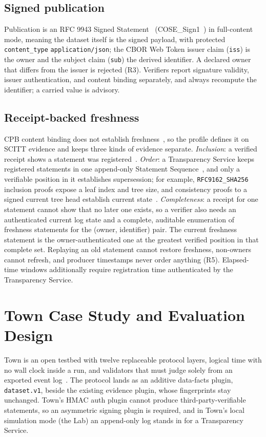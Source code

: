 \documentclass[conference]{IEEEtran}
\begin{document}
\subsection{Signed publication}
Publication is an RFC 9943 Signed Statement~\cite{rfc9943} (COSE\_Sign1~\cite{rfc9052}) in full-content mode, meaning the dataset itself is the signed payload, with protected \texttt{content\_type} \texttt{application/json}; the CBOR Web Token issuer claim (\texttt{iss}) is the owner and the subject claim (\texttt{sub}) the derived identifier. A declared owner that differs from the issuer is rejected (R3). Verifiers report signature validity, issuer authentication, and content binding separately, and always recompute the identifier; a carried value is advisory.

\subsection{Receipt-backed freshness}
CPB content binding does not establish freshness~\cite{cpb03}, so the profile defines it on SCITT evidence and keeps three kinds of evidence separate. \emph{Inclusion}: a verified receipt shows a statement was registered~\cite{rfc9942}. \emph{Order}: a Transparency Service keeps registered statements in one append-only Statement Sequence~\cite{rfc9943}, and only a verifiable position in it establishes supersession; for example, \texttt{RFC9162\_SHA256} inclusion proofs expose a leaf index and tree size, and consistency proofs to a signed current tree head establish current state~\cite{rfc9162}. \emph{Completeness}: a receipt for one statement cannot show that no later one exists, so a verifier also needs an authenticated current log state and a complete, auditable enumeration of freshness statements for the (owner, identifier) pair. The current freshness statement is the owner-authenticated one at the greatest verified position in that complete set. Replaying an old statement cannot restore freshness, non-owners cannot refresh, and producer timestamps never order anything (R5). Elapsed-time windows additionally require registration time authenticated by the Transparency Service.

\section{Town Case Study and Evaluation Design}

Town is an open testbed with twelve replaceable protocol layers, logical time with no wall clock inside a run, and validators that must judge solely from an exported event log~\cite{town}. The protocol lands as an additive data-facts plugin, \texttt{dataset.v1}, beside the existing evidence plugin, whose fingerprints stay unchanged. Town's HMAC auth plugin cannot produce third-party-verifiable statements, so an asymmetric signing plugin is required, and in Town's local simulation mode (the Lab) an append-only log stands in for a Transparency Service.
\end{document}

